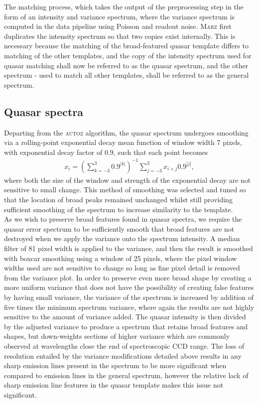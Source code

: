 \documentclass[iop]{emulateapj}
\newcommand{\autoz}{\textsc{autoz}}
\newcommand{\marz}{\textsc{Marz}}
\begin{document}
The matching process, which takes the output of the preprocessing step in the form of an intensity and variance spectrum, where the variance spectrum is computed in the data pipeline using Poisson and readout noise. \marz{} first duplicates the intensity spectrum so that two copies exist internally. This is necessary because the matching of the broad-featured quasar template differs to matching of the other templates, and the copy of the intensity spectrum used for quasar matching shall now be referred to as the quasar spectrum, and the other spectrum - used to match all other templates, shall be referred to as the general spectrum.\\

\subsection{Quasar spectra}

Departing from the \autoz{} algorithm, the quasar spectrum undergoes smoothing via a rolling-point exponential decay mean function of window width 7 pixels, with exponential decay factor of $0.9$, such that each point becomes
\begin{align}
x_i = \left( \sum_{k = -3}^3 0.9^{|k|}   \right)^{-1} \sum_{j = -3}^3 x_{i+j} 0.9^{|j|},
\end{align}
where both the size of the window and strength of the exponential decay are not sensitive to small change. This method of smoothing was selected and tuned so that the location of broad peaks remained unchanged whilst still providing sufficient smoothing of the spectrum to increase similarity to the template.\\

As we wish to preserve broad features found in quasar spectra, we require the quasar error spectrum to be sufficiently smooth that broad features are not destroyed when we apply the variance onto the spectrum intensity. A median filter of 81 pixel width is applied to the variance, and then the result is smoothed with boxcar smoothing using a window of 25 pixels, where the pixel window widths used are not sensitive to change so long as fine pixel detail is removed from the variance plot. In order to preserve even more broad shape by creating a more uniform variance that does not have the possibility of creating false features by having small variance, the variance of the spectrum is increased by addition of five times the minimum spectrum variance, where again the results are not highly sensitive to the amount of variance added. The quasar intensity is then divided by the adjusted variance to produce a spectrum that retains broad features and shapes, but down-weights sections of higher variance which are commonly observed at wavelengths close the end of spectroscopic CCD range. The loss of resolution entailed by the variance modifications detailed above results in any sharp emission lines present in the spectrum to be more significant when compared to emission lines in the general spectrum, however the relative lack of sharp emission line features in the quasar template makes this issue not significant.\\
\end{document}
